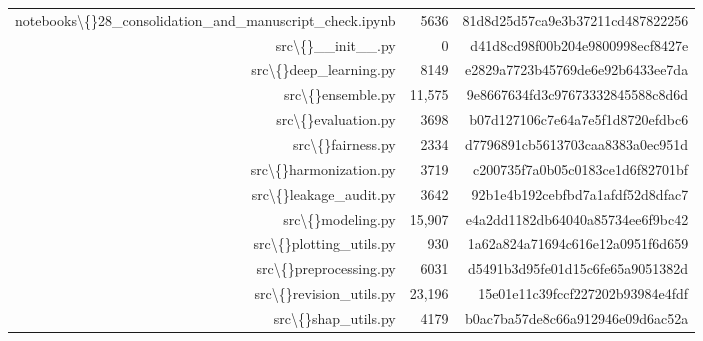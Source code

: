 \documentclass[10pt]{article}
\begin{document}
\begin{longtable}{rrr}
notebooks\textbackslash\{\}28\_consolidation\_and\_manuscript\_check.ipynb & 5636 & 81d8d25d57ca9e3b37211cd487822256 \\
src\textbackslash\{\}\_\_init\_\_.py & 0 & d41d8cd98f00b204e9800998ecf8427e \\
src\textbackslash\{\}deep\_learning.py & 8149 & e2829a7723b45769de6e92b6433ee7da \\
src\textbackslash\{\}ensemble.py & 11{,}575 & 9e8667634fd3c97673332845588c8d6d \\
src\textbackslash\{\}evaluation.py & 3698 & b07d127106c7e64a7e5f1d8720efdbc6 \\
src\textbackslash\{\}fairness.py & 2334 & d7796891cb5613703caa8383a0ec951d \\
src\textbackslash\{\}harmonization.py & 3719 & c200735f7a0b05c0183ce1d6f82701bf \\
src\textbackslash\{\}leakage\_audit.py & 3642 & 92b1e4b192cebfbd7a1afdf52d8dfac7 \\
src\textbackslash\{\}modeling.py & 15{,}907 & e4a2dd1182db64040a85734ee6f9bc42 \\
src\textbackslash\{\}plotting\_utils.py & 930 & 1a62a824a71694c616e12a0951f6d659 \\
src\textbackslash\{\}preprocessing.py & 6031 & d5491b3d95fe01d15c6fe65a9051382d \\
src\textbackslash\{\}revision\_utils.py & 23{,}196 & 15e01e11c39fccf227202b93984e4fdf \\
src\textbackslash\{\}shap\_utils.py & 4179 & b0ac7ba57de8c66a912946e09d6ac52a \\
\bottomrule
\end{longtable}
\normalsize
\end{document}
